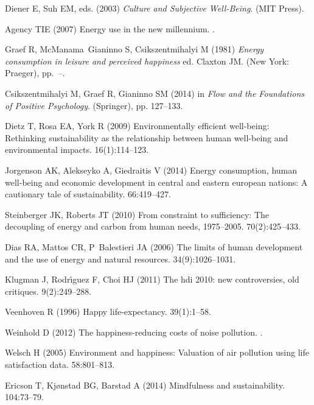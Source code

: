 \documentclass[10pt, letterpaper]{article}
\begin{document}
\begin{spacing}{1.4}
\begin{thebibliography}{10}
Diener E, Suh EM, eds. (2003) {\em Culture and Subjective Well-Being}.
\newblock (MIT Press).

Agency TIE (2007) Energy use in the new millennium.
.

Graef R, McManama~Gianinno S, Csikszentmihalyi M (1981) {\em Energy consumption
  in leisure and perceived happiness} ed.{} Claxton JM.
\newblock (New York: Praeger), pp.~--.

Csikszentmihalyi M, Graef R, Gianinno SM (2014) in {\em Flow and the
  Foundations of Positive Psychology}.
\newblock (Springer), pp. 127--133.

Dietz T, Rosa EA, York R (2009) Environmentally efficient well-being:
  Rethinking sustainability as the relationship between human well-being and
  environmental impacts.
 16(1):114--123.

Jorgenson AK, Alekseyko A, Giedraitis V (2014) Energy consumption, human
  well-being and economic development in central and eastern european nations:
  A cautionary tale of sustainability.
 66:419--427.

Steinberger JK, Roberts JT (2010) From constraint to sufficiency: The
  decoupling of energy and carbon from human needs, 1975--2005.
 70(2):425--433.

Dias RA, Mattos CR, P~Balestieri JA (2006) The limits of human development and
  the use of energy and natural resources.
 34(9):1026--1031.

Klugman J, Rodr{\'\i}guez F, Choi HJ (2011) The hdi 2010: new controversies,
  old critiques.
 9(2):249--288.

Veenhoven R (1996) Happy life-expectancy.
 39(1):1--58.

Weinhold D (2012) The happiness-reducing costs of noise pollution.
.

Welsch H (2005) Environment and happiness: Valuation of air pollution using
  life satisfaction data.
 58:801--813.

Ericson T, Kj{\o}nstad BG, Barstad A (2014) Mindfulness and sustainability.
 104:73--79.


\end{thebibliography}
\end{spacing}
\end{document}
